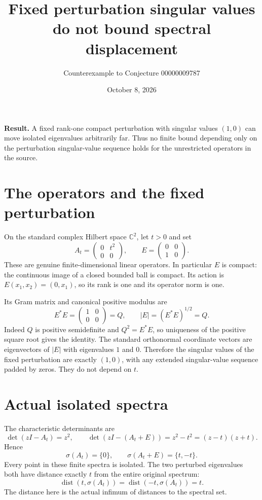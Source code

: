 \documentclass[11pt]{article}
\title{Fixed perturbation singular values do not bound spectral displacement}
\author{Counterexample to Conjecture 00000009787}
\date{October 8, 2026}
\begin{document}
\maketitle
\noindent\textbf{Result.} A fixed rank-one compact perturbation with singular values $(1,0)$ can move isolated eigenvalues arbitrarily far. Thus no finite bound depending only on the perturbation singular-value sequence holds for the unrestricted operators in the source.

\section*{The operators and the fixed perturbation}
On the standard complex Hilbert space $\mathbb C^2$, let $t>0$ and set
\[
 A_t=\begin{pmatrix}0&t^2\\0&0\end{pmatrix},\qquad
 E=\begin{pmatrix}0&0\\1&0\end{pmatrix}.
\]
These are genuine finite-dimensional linear operators. In particular $E$ is compact: the continuous image of a closed bounded ball is compact. Its action is $E(x_1,x_2)=(0,x_1)$, so its rank is one and its operator norm is one.

Its Gram matrix and canonical positive modulus are
\[
 E^*E=\begin{pmatrix}1&0\\0&0\end{pmatrix}=Q,
 \qquad |E|=(E^*E)^{1/2}=Q.
\]
Indeed $Q$ is positive semidefinite and $Q^2=E^*E$, so uniqueness of the positive square root gives the identity. The standard orthonormal coordinate vectors are eigenvectors of $|E|$ with eigenvalues $1$ and $0$. Therefore the singular values of the fixed perturbation are exactly $(1,0)$, with any extended singular-value sequence padded by zeros. They do not depend on $t$.

\section*{Actual isolated spectra}
The characteristic determinants are
\[
 \det(zI-A_t)=z^2,\qquad
 \det(zI-(A_t+E))=z^2-t^2=(z-t)(z+t).
\]
Hence
\[
 \sigma(A_t)=\{0\},\qquad \sigma(A_t+E)=\{t,-t\}.
\]
Every point in these finite spectra is isolated. The two perturbed eigenvalues both have distance exactly $t$ from the entire original spectrum:
\[
 \operatorname{dist}(t,\sigma(A_t))=
 \operatorname{dist}(-t,\sigma(A_t))=t.
\]
The distance here is the actual infimum of distances to the spectral set.
\end{document}
